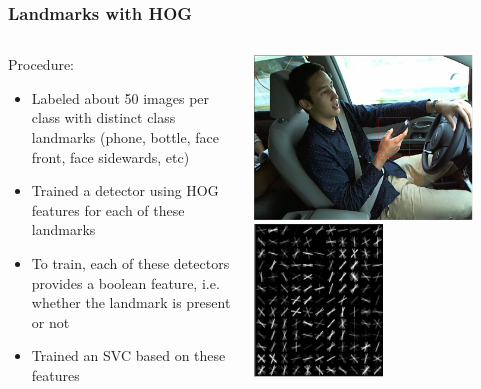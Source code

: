 \documentclass{beamer}
\begin{document}
	\begin{frame}
		\frametitle{Landmarks with HOG}		
		\begin{columns}
			\begin{column}{0.5\textwidth}
				Procedure:
				\begin{itemize}
					\item Labeled about 50 images per class with distinct class landmarks (phone, bottle, face front, face sidewards, etc)
					\item Trained a detector using HOG features for each of these landmarks
					\item To train, each of these detectors provides a boolean feature, i.e. whether the landmark is present or not
					\item Trained an SVC based on these features					
				\end{itemize}
			\end{column}
			\begin{column}{0.5\textwidth}
				\begin{center}
					\includegraphics[width=0.85\textwidth]{mult_HOG/HOG_phone_det}\\
					\includegraphics[width=0.5\textwidth]{mult_HOG/HOG_phone}
				\end{center}
			\end{column}
		\end{columns}
		
	\end{frame}
\end{document}
